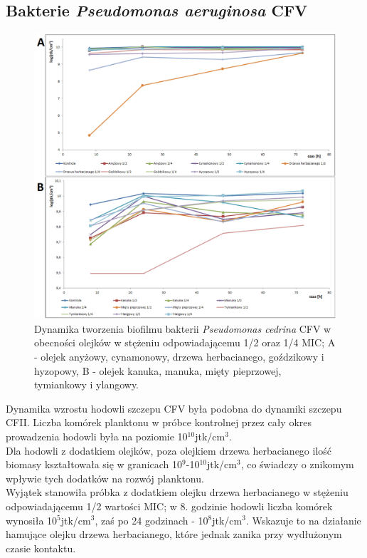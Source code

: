 \documentclass[11pt,a4paper]{report}
\begin{document}
\subsection{Bakterie \textit{Pseudomonas aeruginosa} CFV}
\begin{figure}[!h]
\begin{center}
\includegraphics[scale=0.50]{img/cfv-c.png}
\caption{Dynamika tworzenia biofilmu bakterii \textit{Pseudomonas cedrina} CFV w obecności olejków w stężeniu odpowiadającemu 1/2 oraz 1/4 MIC; A - olejek anyżowy, cynamonowy, drzewa herbacianego, goździkowy i hyzopowy, B - olejek kanuka, manuka, mięty pieprzowej, tymiankowy i ylangowy.}\label{cfv-c}
\end{center} 
\end{figure}

\clearpage

Dynamika wzrostu hodowli szczepu CFV była podobna do dynamiki szczepu CFII. Liczba komórek planktonu w próbce kontrolnej przez cały okres prowadzenia hodowli była na poziomie 10$^10$jtk/cm$^3$.\\
Dla hodowli z dodatkiem olejków, poza olejkiem drzewa herbacianego ilość biomasy kształtowała się w granicach 10$^9$-10$^10$jtk/cm$^3$, co świadczy o znikomym wpływie tych dodatków na rozwój planktonu.\\
Wyjątek stanowiła próbka z dodatkiem olejku drzewa herbacianego w stężeniu odpowiadającemu 1/2 wartości MIC; w 8. godzinie hodowli liczba komórek wynosiła 10$^5$jtk/cm$^3$, zaś po 24 godzinach - 10$^8$jtk/cm$^3$. Wskazuje to na działanie hamujące olejku drzewa herbacianego, które jednak zanika przy wydłużonym czasie kontaktu.
\end{document}
